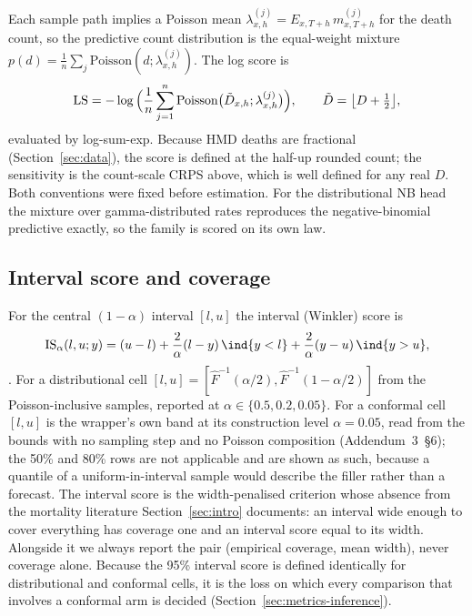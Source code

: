 Each sample path implies a Poisson mean $\lambda^{(j)}_{x,h} =
E_{x,T+h}\,m^{(j)}_{x,T+h}$ for the death count, so the predictive count
distribution is the equal-weight mixture
$p(d)=\frac1n\sum_j \mathrm{Poisson}(d;\lambda^{(j)}_{x,h})$. The log score is
\begin{equation}
  \operatorname{LS} = -\log\Big(\frac1n\sum_{j=1}^{n}\mathrm{Poisson}\big(\tilde D_{x,h};\lambda^{(j)}_{x,h}\big)\Big),
  \qquad \tilde D = \big\lfloor D+\tfrac12\big\rfloor,
\end{equation}
evaluated by log-sum-exp. Because HMD deaths are fractional
(Section~\ref{sec:data}), the score is defined at the half-up rounded
count; the sensitivity is the count-scale CRPS above, which is well defined
for any real $D$. Both conventions were fixed before estimation. For the
distributional NB head the mixture over gamma-distributed rates reproduces
the negative-binomial predictive exactly, so the family is scored on its
own law.

\subsection{Interval score and coverage}
\label{sec:metrics-interval}

For the central $(1-\alpha)$ interval $[l,u]$ the interval (Winkler) score
is
\begin{equation}
  \IS_\alpha(l,u;y) = (u-l) + \frac{2}{\alpha}(l-y)\,\ind\{y<l\}
  + \frac{2}{\alpha}(y-u)\,\ind\{y>u\},
  \label{eq:winkler}
\end{equation}
\citep{winkler1972decision,gneiting2007strictly}. For a distributional cell
$[l,u]=[\hat F^{-1}(\alpha/2),\hat F^{-1}(1-\alpha/2)]$ from the
Poisson-inclusive samples, reported at $\alpha\in\{0.5,0.2,0.05\}$. For a
conformal cell $[l,u]$ is the wrapper's own band at its construction level
$\alpha=0.05$, read from the bounds with no sampling step and no Poisson
composition (Addendum~3~\S6); the 50\% and 80\% rows are not applicable and
are shown as such, because a quantile of a uniform-in-interval sample would
describe the filler rather than a forecast. The interval score is the
width-penalised criterion whose absence from the mortality literature
Section~\ref{sec:intro} documents: an interval wide enough to cover
everything has coverage one and an interval score equal to its width.
Alongside it we always report the pair (empirical coverage, mean width),
never coverage alone. Because the 95\% interval score is defined
identically for distributional and conformal cells, it is the loss on
which every comparison that involves a conformal arm is decided
(Section~\ref{sec:metrics-inference}).

